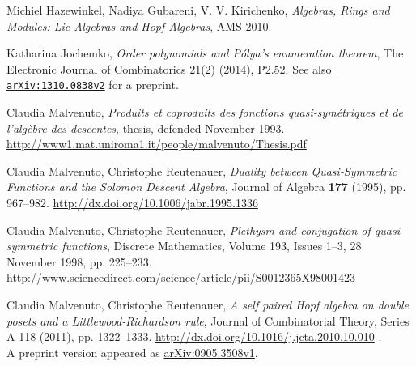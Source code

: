 \documentclass[numbers=enddot,12pt,final,onecolumn,notitlepage,abstracton]{scrartcl}%
\theoremstyle{definition}
\begin{document}
\begin{thebibliography}{99999999}
Michiel Hazewinkel, Nadiya Gubareni, V. V. Kirichenko,
\textit{Algebras, Rings and Modules: Lie Algebras and Hopf Algebras},
AMS 2010.


Katharina Jochemko, \textit{Order polynomials and
P\'{o}lya's enumeration theorem},
The Electronic Journal of Combinatorics 21(2) (2014), P2.52.
See also
\texttt{\href{http://arxiv.org/abs/1310.0838v2}{arXiv:1310.0838v2}}
for a preprint.


Claudia Malvenuto, \textit{Produits et
coproduits des fonctions quasi-sym\'{e}triques et de l'alg\`{e}bre des
descentes}, thesis, defended November 1993.\newline
\url{http://www1.mat.uniroma1.it/people/malvenuto/Thesis.pdf}

Claudia Malvenuto, Christophe Reutenauer,
\textit{Duality between Quasi-Symmetric Functions and the Solomon
Descent Algebra},
Journal of Algebra \textbf{177} (1995), pp. 967--982.
\newline\url{http://dx.doi.org/10.1006/jabr.1995.1336}

Claudia Malvenuto, Christophe Reutenauer,
\textit{Plethysm and conjugation of quasi-symmetric functions}, Discrete
Mathematics, Volume 193, Issues 1--3, 28 November 1998, pp.
225--233.\newline
\url{http://www.sciencedirect.com/science/article/pii/S0012365X98001423}

Claudia Malvenuto, Christophe Reutenauer,
\textit{A self paired Hopf algebra on double posets and
a Littlewood-Richardson rule},
Journal of Combinatorial Theory, Series A 118 (2011), pp. 1322--1333.
\newline
\url{http://dx.doi.org/10.1016/j.jcta.2010.10.010} . \\
A preprint version appeared as
\href{http://arxiv.org/abs/0905.3508v1}{arXiv:0905.3508v1}.


\end{thebibliography}
\end{document}
